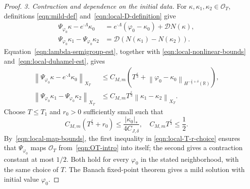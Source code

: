 \documentclass[10pt,a4paper]{amsart}
\newcommand{\R}{\mathbb{R}}
\newcommand{\abs}[1]{\left\lvert #1 \right\rvert}
\newcommand{\hr}[1]{H^{#1}(\R)}
\newcommand{\mc}[1]{\mathcal{#1}}
\newcommand{\norm}[1]{\left\lVert #1 \right\rVert}
\newcommand{\paren}[1]{\left(#1\right)}
\newcommand{\vph}{\varphi}
\begin{document}
\begin{proof}
\emph{3. Contraction and dependence on the initial data.}
For $\kappa,\kappa_1,\kappa_2\in\mc O_T$, definitions
\eqref{eqn:mild-def} and~\eqref{eqn:local-D-definition} give
\begin{equation*}
    \begin{aligned}
        \Psi_{\vph_0}\kappa-e^{\cdot\Lambda}\kappa_0
        &=e^{\cdot\Lambda}(\vph_0-\kappa_0)+\mc D N(\kappa),\\
        \Psi_{\vph_0}\kappa_1-\Psi_{\vph_0}\kappa_2
        &=\mc D\paren{N(\kappa_1)-N(\kappa_2)}.
    \end{aligned}
\end{equation*}
Equation~\eqref{eqn:lambda-semigroup-est}, together with
\eqref{eqn:local-nonlinear-bounds} and~\eqref{eqn:local-duhamel-est}, gives
\begin{equation}\label{eqn:local-map-bounds}
\begin{aligned}
    \norm{\Psi_{\vph_0}\kappa-e^{\cdot\Lambda}\kappa_0}_{X_T}
    &\le C_{M,m}\paren{
        T^{\frac{\varepsilon}{3}}
        +\norm{\vph_0-\kappa_0}_{\hr{-\frac12+\delta}}
    },\\
    \norm{\Psi_{\vph_0}\kappa_1-\Psi_{\vph_0}\kappa_2}_{X_T}
    &\le C_{M,m}T^{\frac{\varepsilon}{3}}
        \norm{\kappa_1-\kappa_2}_{X_T}.
\end{aligned}
\end{equation}
Choose $T\le T_1$ and $r_0>0$ sufficiently small such that
\begin{equation}\label{eqn:local-T-r-choice}
    C_{M,m}\paren{T^{\frac{\varepsilon}{3}}+r_0}
    \le\frac{\abs{\kappa_0}_*}{4C_{J,\delta}},
    \quad
    C_{M,m}T^{\frac{\varepsilon}{3}}\le\frac12.
\end{equation}
By~\eqref{eqn:local-map-bounds}, the first inequality in
\eqref{eqn:local-T-r-choice} ensures that $\Psi_{\vph_0}$ maps
$\mc O_T$ from~\eqref{eqn:OT-intro} into itself; the second gives
a contraction constant at most $1/2$.
Both hold for every $\vph_0$ in the stated neighborhood, with the same
choice of $T$. The Banach fixed-point theorem
gives a mild solution with initial value $\vph_0$.


\end{proof}
\end{document}
